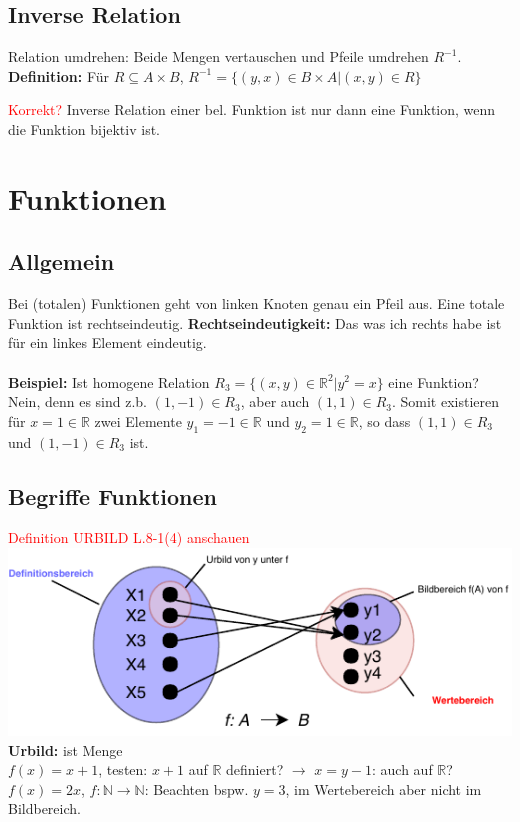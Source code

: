 \documentclass[8pt,landscape]{scrartcl}
\begin{document}
\begin{multicols}{3}
\subsection{Inverse Relation}
Relation umdrehen: Beide Mengen vertauschen und Pfeile umdrehen $R^{-1}$.\\
\textbf{Definition:} F\"ur $R \subseteq A \times B$, $R^{-1} = \{ (y, x) \in B \times A | (x, y) \in R \}$

\textcolor{red}{Korrekt?} Inverse Relation einer bel. Funktion ist nur dann eine Funktion, wenn die Funktion bijektiv ist.




\section{Funktionen}

\subsection{Allgemein}
Bei (totalen) Funktionen geht von linken Knoten genau ein Pfeil aus.
Eine totale Funktion ist rechtseindeutig.
\textbf{Rechtseindeutigkeit:} Das was ich rechts habe ist für ein linkes Element eindeutig.\\\\
\textbf{Beispiel:} Ist homogene Relation $R_3 = \{ (x, y) \in \mathbb{R}^2 | y^2 = x \}$ eine Funktion?\\
Nein, denn es sind z.b. $(1, -1) \in R_3$, aber auch $(1, 1) \in R_3$.
Somit existieren f\"ur $x=1 \in \mathbb{R}$ zwei Elemente $y_1 = -1 \in \mathbb{R}$ und $y_2 = 1 \in \mathbb{R}$, so dass $(1, 1) \in R_3$ und $(1, -1) \in R_3$ ist.

\subsection{Begriffe Funktionen}
\textcolor{red}{Definition URBILD L.8-1(4) anschauen}\\
\includegraphics[width=0.95\linewidth]{./begriffe_funktionen.pdf}\\
\textbf{Urbild:} ist Menge\\
$f(x) = x + 1$, testen: $x+1$ auf $\mathbb{R}$ definiert? $\rightarrow$ $x=y-1$: auch auf $\mathbb{R}$?\\
$f(x) = 2x$, $f: \mathbb{N} \rightarrow \mathbb{N}$: Beachten bspw. $y=3$, im Wertebereich aber nicht im Bildbereich.




\end{multicols}
\end{document}
